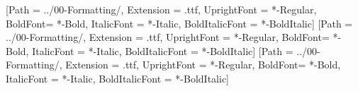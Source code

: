 
\usepackage[a4paper, margin=2.2cm, headheight=2cm, headsep=0.6cm, voffset=0.1cm]{geometry} %
\usepackage{natbib}                     %
\usepackage{multicol}                   %
\usepackage{graphicx}                   %
\usepackage{subcaption}                 %
\usepackage[export]{adjustbox}          %
\usepackage{wrapfig}                    %
\usepackage{float}                      %
\usepackage{sectsty}                    %
\usepackage{xcolor,colortbl}            %
\usepackage{fancyhdr}                   %
\usepackage{fontspec}                   %
\usepackage{tabularx}                   %
\usepackage{enumitem}                   %
\usepackage[hidelinks]{hyperref}        %

    

[Path = ../00-Formatting/, Extension = .ttf, UprightFont = *-Regular, BoldFont= *-Bold, ItalicFont = *-Italic, BoldItalicFont = *-BoldItalic]
[Path = ../00-Formatting/, Extension = .ttf, UprightFont = *-Regular, BoldFont= *-Bold, ItalicFont = *-Italic, BoldItalicFont = *-BoldItalic]
\setmainfont{DMSans}[Path = ../00-Formatting/, Extension = .ttf, UprightFont = *-Regular, BoldFont= *-Bold, ItalicFont = *-Italic, BoldItalicFont = *-BoldItalic]



\sectionfont{\eco\uppercase}
\subsectionfont{\eco\uppercase}
\subsubsectionfont{\eco\uppercase}



\pagestyle{fancy}
\fancyhf{}
\fancyfoot[R]{\eco\\ \thepage}





\renewcommand{\footrulewidth}{0.4pt} %
\renewcommand{\bibsection}{\section{Bibliography}} %